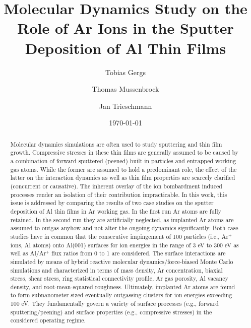 \documentclass[12pt,a4paper,preprint,superscriptaddress]{revtex4-1}
\begin{document}

\title{Molecular Dynamics Study on the Role of Ar Ions in the Sputter Deposition of Al Thin Films}
\date{\today}
\author{Tobias Gergs}
\author{Thomas Mussenbrock}
\author{Jan Trieschmann}

\begin{abstract}
Molecular dynamics simulations are often used to study sputtering and thin film growth. Compressive stresses in these thin films are generally assumed to be caused by a combination of forward sputtered (peened) built-in particles and entrapped working gas atoms. While the former are assumed to hold a predominant role, the effect of the latter on the interaction dynamics as well as thin film properties are scarcely clarified (concurrent or causative). The inherent overlay of the ion bombardment induced processes render an isolation of their contribution impracticable. In this work, this issue is addressed by comparing the results of two case studies on the sputter deposition of Al thin films in Ar working gas. In the first run Ar atoms are fully retained. In the second run they are artificially neglected, as implanted Ar atoms are assumed to outgas anyhow and not alter the ongoing dynamics significantly. Both case studies have in common that the consecutive impingement of 100 particles (i.e., Ar$^+$ ions, Al atoms) onto Al(001) surfaces for ion energies in the range of 3 eV to 300 eV as well as Al/Ar$^+$ flux ratios from 0 to 1 are considered. The surface interactions are simulated by means of hybrid reactive molecular dynamics/force-biased Monte Carlo simulations and characterized in terms of mass density, Ar concentration, biaxial stress, shear stress, ring statistical connectivity profile, Ar gas porosity, Al vacancy density, and root-mean-squared roughness. Ultimately, implanted Ar atoms are found to form subnanometer sized eventually outgassing clusters for ion energies exceeding 100 eV. They fundamentally govern a variety of surface processes (e.g., forward sputtering/peening) and surface properties (e.g., compressive stresses) in the considered operating regime.
\end{abstract}
\end{document}
